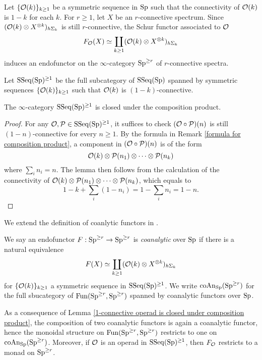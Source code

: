 Let $\{{\mathcal{O}}(k)\}_{k \geq 1}$ be a symmetric sequence in $\operatorname{Sp}$ such that the connectivity of ${\mathcal{O}}(k)$ is $1-k$ for each $k$. 
For $r \geq 1$, let $X$ be an $r$-connective spectrum.
 Since $({\mathcal{O}}(k) \otimes X^{\otimes k})_{h\Sigma_k}$ is still $r$-connective, the Schur functor associated to ${\mathcal{O}}$ 
    $$
    F_{{\mathcal{O}}}(X) \simeq 
    \coprod_{k \geq 1} ({\mathcal{O}}(k) \otimes X^{\otimes k})_{h\Sigma_k}
    $$
induces an endofunctor on the $\infty$-category $\operatorname{Sp}^{\geq r}$ of $r$-connective spectra.

Let $\operatorname{SSeq}(\operatorname{Sp})^{\geq 1}$ be the full subcategory of $\operatorname{SSeq}(\operatorname{Sp})$ spanned by symmetric sequences $\{{\mathcal{O}}(k)\}_{k \geq 1}$ such that ${\mathcal{O}}(k)$ is $(1-k)$-connective.
\begin{lemma}
\label{1-connective operad is closed under composition product}
	The $\infty$-category $\operatorname{SSeq}(\operatorname{Sp})^{\geq 1}$ is closed under the composition product.
\end{lemma}
\begin{proof}
	For any ${\mathcal{O}},{\mathcal{P}} \in \operatorname{SSeq}(\operatorname{Sp})^{\geq 1}$, it suffices to check $({\mathcal{O}} \circ {\mathcal{P}})(n)$ is still $(1-n)$-connective for every $n\geq 1$.
	By the formula in Remark \ref{formula for composition product}, a component in $({\mathcal{O}} \circ {\mathcal{P}})(n)$ is of the form
	$$
	{\mathcal{O}}(k) \otimes {\mathcal{P}}(n_1) \otimes \cdots \otimes {\mathcal{P}}(n_k)
	$$
	where $\sum_i n_i = n$. The lemma then follows from the calculation of the connectivity of 
	$	{\mathcal{O}}(k) \otimes {\mathcal{P}}(n_1) \otimes \cdots \otimes {\mathcal{P}}(n_k)$, which equals to 
	$$
	1- k + \sum_i (1-n_i)= 1 - \sum_in_i=1-n.
	$$
\end{proof}

We extend the definition of coanlytic functors in \cite[Definition 4.3]{heuts2018lie}.
\begin{definition}
\label{coanalytic functors on r-conn spectra}
We say an endofunctor $F:\operatorname{Sp}^{\geq r} \to \operatorname{Sp}^{\geq r}$ is \emph{coanalytic} over $\operatorname{Sp}$ if there is a natural equivalence
	$$
	F(X) \simeq
	\coprod_{k\geq 1} ({\mathcal{O}}(k)\otimes X^{\otimes k})_{h\Sigma_k}
	$$
	for $\{{\mathcal{O}}(k)\}_{k \geq 1}$ a symmetric sequence in $\operatorname{SSeq}(\operatorname{Sp})^{\geq 1}$. 
	We write $\operatorname{coAn}_{\operatorname{Sp}}(\operatorname{Sp}^{\geq r})$ for the full sbucategory of $\operatorname{Fun}(\operatorname{Sp}^{\geq r},\operatorname{Sp}^{\geq r})$ spanned by coanalytic functors over $\operatorname{Sp}$.
\end{definition}
As a consequence of Lemma \ref{1-connective operad is closed under composition product}, the composition of two coanalytic functors is again a coanalytic functor, hence the monoidal structure on $\operatorname{Fun}(\operatorname{Sp}^{\geq r}, \operatorname{Sp}^{\geq r})$ restricts to one on $\operatorname{coAn}_{\operatorname{Sp}}(\operatorname{Sp}^{\geq r})$.
Moreover, if ${\mathcal{O}}$ is an operad in $\operatorname{SSeq}(\operatorname{Sp})^{\geq 1}$, then $F_{{\mathcal{O}}}$ restricts to a monad on $\operatorname{Sp}^{\geq r}$.


